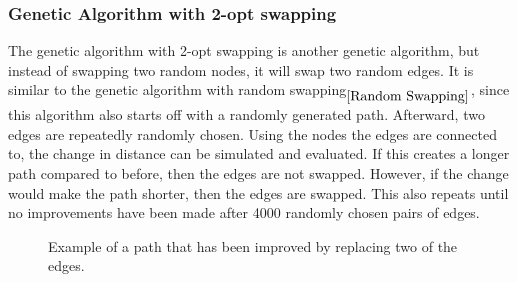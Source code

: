 \documentclass{article}
\begin{document}
\subsubsection{Genetic Algorithm with 2-opt swapping}\label{2-opt swapping}
The genetic algorithm with 2-opt swapping is another genetic algorithm, but instead of swapping two random nodes, it will swap two random edges. It is similar to the genetic algorithm with random swapping$_{\ref{Random Swapping}}$, since this algorithm also starts off with a randomly generated path. Afterward, two edges are repeatedly randomly chosen. Using the nodes the edges are connected to, the change in distance can be simulated and evaluated. If this creates a longer path compared to before, then the edges are not swapped. However, if the change would make the path shorter, then the edges are swapped. This also repeats until no improvements have been made after 4000 randomly chosen pairs of edges.


\begin{figure}[ht]
     \centering
     \caption{Example of a path that has been improved by replacing two of the edges.}
     \label{Figure:2opt}
\end{figure}
\end{document}

